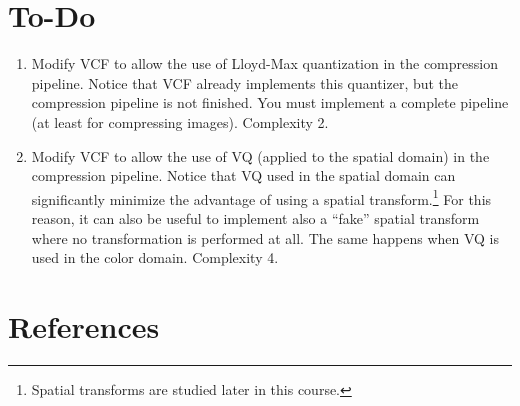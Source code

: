 \section{To-Do}
\begin{enumerate}
\item Modify VCF to allow the use of Lloyd-Max quantization in the
  compression pipeline. Notice that VCF already implements this
  quantizer, but the compression pipeline is not finished. You must
  implement a complete pipeline (at least for compressing
  images). Complexity 2.
\item Modify VCF to allow the use of VQ (applied to the spatial
  domain) in the compression pipeline. Notice that VQ used in the
  spatial domain can significantly minimize the advantage of using a
  spatial transform.\footnote{Spatial transforms are studied later in
    this course.} For this reason, it can also be useful to implement
  also a ``fake'' spatial transform where no transformation is performed
  at all. The same happens when VQ is used in the color
  domain. Complexity 4.
\end{enumerate}

\section{References}

\renewcommand{\addcontentsline}[3]{}%

